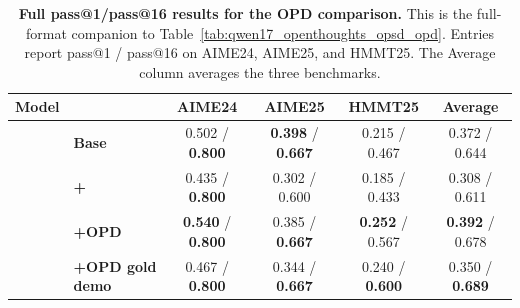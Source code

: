 \begin{table}[!htbp]
\centering
\caption{\textbf{Full pass@1/pass@16 results for the \qwenonesevenb{} OPD comparison.}
This is the full-format companion to Table~\ref{tab:qwen17_openthoughts_opsd_opd}. Entries report pass@1 / pass@16 on AIME24, AIME25, and HMMT25. The Average column averages the three benchmarks.}
\label{tab:qwen17_openthoughts_opsd_opd_full}
\footnotesize
\setlength{\tabcolsep}{3pt}
\renewcommand{\arraystretch}{1.12}

\newcommand{\metrichead}[1]{%
  \textbf{#1}%
}

\begin{tabular*}{\textwidth}{@{\extracolsep{\fill}}llcccc@{}}
\toprule
\textbf{Model}
&
& \metrichead{AIME24}
& \metrichead{AIME25}
& \metrichead{HMMT25}
& \metrichead{Average} \\
\midrule

\multirow{4}{*}{\textbf{\qwenonesevenb{}}}
& \textbf{Base}
& 0.502 / \textbf{0.800}
& \textbf{0.398} / \textbf{0.667}
& 0.215 / 0.467
& 0.372 / 0.644 \\

&
\textbf{+\opsd{}}
& 0.435 / \textbf{0.800}
& 0.302 / 0.600
& 0.185 / 0.433
& 0.308 / 0.611 \\

&
\textbf{+OPD}
& \textbf{0.540} / \textbf{0.800}
& 0.385 / \textbf{0.667}
& \textbf{0.252} / 0.567
& \textbf{0.392} / 0.678 \\

&
\textbf{+OPD gold demo}
& 0.467 / \textbf{0.800}
& 0.344 / \textbf{0.667}
& 0.240 / \textbf{0.600}
& 0.350 / \textbf{0.689} \\

\bottomrule
\end{tabular*}
\end{table}
